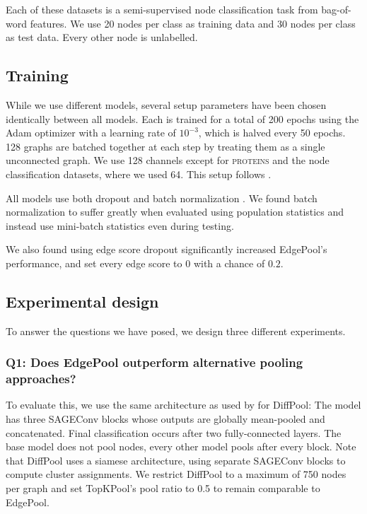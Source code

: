 \documentclass{article}
\newcommand{\edgepool}{EdgePool}
\newcommand{\datasetname}[1]{\textsc{#1}}
\newcommand{\proteins}{\datasetname{proteins}}
\newcommand{\sageconv}{SAGEConv}
\begin{document}
Each of these datasets is a semi-supervised node classification task from bag-of-word features. We use 20 nodes per class as training data and 30 nodes per class as test data. Every other node is unlabelled.


\subsection{Training}

While we use different models, several setup parameters have been chosen identically between all models. Each is trained for a total of 200 epochs using the Adam optimizer \citep{Kingma2014} with a learning rate of $10^{-3}$, which is halved every 50 epochs. 128 graphs are batched together at each step by treating them as a single unconnected graph. We use 128 channels except for \proteins{} and the node classification datasets, where we used 64. This setup follows \citet{yingHierarchicalGraphRepresentation2018}.

All models use both dropout and batch normalization \citep{Ioffe2015}. We found batch normalization to suffer greatly when evaluated using population statistics and instead use mini-batch statistics even during testing.

We also found using edge score dropout significantly increased \edgepool{}'s performance, and set every edge score to $0$ with a chance of $0.2$.

\subsection{Experimental design}

To answer the questions we have posed, we design three different experiments.

\subsubsection{Q1: Does \edgepool{} outperform alternative pooling approaches?}
To evaluate this, we use the same architecture as used by \citet{yingHierarchicalGraphRepresentation2018} for DiffPool: The model has three \sageconv{} blocks \citep{hamiltonInductiveRepresentationLearning2017} whose outputs are globally mean-pooled and concatenated. Final classification occurs after two fully-connected layers. The base model does not pool nodes, every other model pools after every block. Note that DiffPool uses a siamese architecture, using separate \sageconv{} blocks to compute cluster assignments. We restrict DiffPool to a maximum of 750 nodes per graph and set TopKPool's pool ratio to 0.5 to remain comparable to EdgePool.
\end{document}
